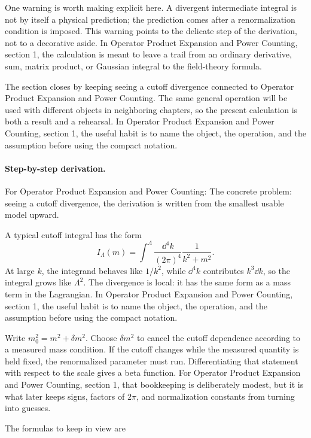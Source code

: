 One warning is worth making explicit here.  A divergent intermediate integral is not by itself a physical prediction; the prediction comes after a renormalization condition is imposed.  This warning points to the delicate step of the derivation, not to a decorative aside.  In Operator Product Expansion and Power Counting, section 1, the calculation is meant to leave a trail from an ordinary derivative, sum, matrix product, or Gaussian integral to the field-theory formula.

The section closes by keeping seeing a cutoff divergence connected to Operator Product Expansion and Power Counting.  The same general operation will be used with different objects in neighboring chapters, so the present calculation is both a result and a rehearsal.  In Operator Product Expansion and Power Counting, section 1, the useful habit is to name the object, the operation, and the assumption before using the compact notation.



\paragraph{Step-by-step derivation.}

For Operator Product Expansion and Power Counting: The concrete problem: seeing a cutoff divergence, the derivation is written from the smallest usable model upward.

A typical cutoff integral has the form
\[
  I_\Lambda(m)=\int^{\Lambda}\frac{\dd^4k}{(2\pi)^4}\frac{1}{k^2+m^2}.
\]
At large \(k\), the integrand behaves like \(1/k^2\), while \(\dd^4k\) contributes \(k^3\dd k\), so the integral grows like \(\Lambda^2\).  The divergence is local: it has the same form as a mass term in the Lagrangian.  In Operator Product Expansion and Power Counting, section 1, the useful habit is to name the object, the operation, and the assumption before using the compact notation.

Write \(m_0^2=m^2+\delta m^2\).  Choose \(\delta m^2\) to cancel the cutoff dependence according to a measured mass condition.  If the cutoff changes while the measured quantity is held fixed, the renormalized parameter must run.  Differentiating that statement with respect to the scale gives a beta function.  For Operator Product Expansion and Power Counting, section 1, that bookkeeping is deliberately modest, but it is what later keeps signs, factors of \(2\pi\), and normalization constants from turning into guesses.

The formulas to keep in view are

